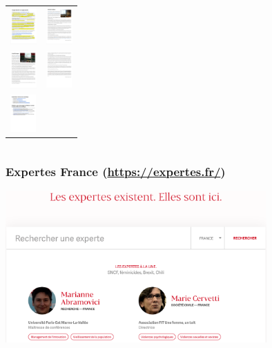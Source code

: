 \documentclass[]{beamer}
\begin{document}
\begin{frame}
\begin{center}
\begin{columns}
\begin{column}{0.3\textwidth}
\begin{tabular}{cc}
          \includegraphics[width=1cm]{pictures/MESRI-06} &
          \includegraphics[width=1cm]{pictures/MESRI-07} \\
          \includegraphics[width=1cm]{pictures/MESRI-08} &
          \includegraphics[width=1cm]{pictures/MESRI-09} \\
          \includegraphics[width=1cm]{pictures/MESRI-10} &
        \end{tabular}
      \end{column}
    \end{columns}
  \end{center}

\end{frame}


\begin{frame}
  \frametitle{Expertes France (\url{https://expertes.fr/})}

    \begin{center}
      \includegraphics[width=10cm]{pictures/expertes}
    \end{center}

\end{frame}
\end{document}
